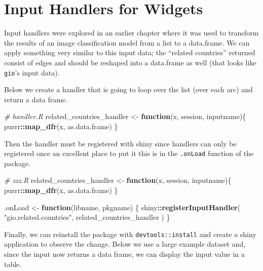 \documentclass[
  10pt,
]{krantz}
\makeatletter
\newenvironment{Shaded}{\begin{snugshade}}{\end{snugshade}}
\newcommand{\CommentTok}[1]{\textcolor[rgb]{0.37,0.37,0.37}{\textit{#1}}}
\newcommand{\ControlFlowTok}[1]{\textcolor[rgb]{0.27,0.27,0.27}{\textbf{#1}}}
\newcommand{\KeywordTok}[1]{\textcolor[rgb]{0.27,0.27,0.27}{\textbf{#1}}}
\newcommand{\NormalTok}[1]{#1}
\newcommand{\OperatorTok}[1]{\textcolor[rgb]{0.43,0.43,0.43}{\textbf{#1}}}
\newcommand{\StringTok}[1]{\textcolor[rgb]{0.5,0.5,0.5}{#1}}
\newenvironment{kframe}{%
\medskip{}
\setlength{\fboxsep}{.8em}
 \def\at@end@of@kframe{}%
 \ifinner\ifhmode%
  \def\at@end@of@kframe{\end{minipage}}%
  \begin{minipage}{\columnwidth}%
 \fi\fi%
 \def\FrameCommand##1{\hskip\@totalleftmargin \hskip-\fboxsep
 \colorbox{shadecolor}{##1}\hskip-\fboxsep
     \hskip-\linewidth \hskip-\@totalleftmargin \hskip\columnwidth}%
 \MakeFramed {\advance\hsize-\width
   \@totalleftmargin\z@ \linewidth\hsize
   \@setminipage}}%
 {\par\unskip\endMakeFramed%
 \at@end@of@kframe}
\renewenvironment{Shaded}{\begin{kframe}}{\end{kframe}}
\makeatother
\begin{document}
\hypertarget{shiny-widgets-handlers}{%
\section{Input Handlers for Widgets}\label{shiny-widgets-handlers}}

Input handlers were explored in an earlier chapter where it was used to transform the results of an image classification model from a list to a data.frame. We can apply something very similar to this input data; the ``related countries'' returned consist of edges and should be reshaped into a data.frame as well (that looks like \texttt{gio}'s input data).

Below we create a handler that is going to loop over the list (over each arc) and return a data frame.

\begin{Shaded}
\begin{Highlighting}[]
\CommentTok{\# handler.R}
\NormalTok{related\_countries\_handler <{-}}\StringTok{ }\ControlFlowTok{function}\NormalTok{(x, session, inputname)\{}
\NormalTok{  purrr}\OperatorTok{::}\KeywordTok{map\_dfr}\NormalTok{(x, as.data.frame)}
\NormalTok{\}}
\end{Highlighting}
\end{Shaded}

Then the handler must be registered with shiny since handlers can only be registered once an excellent place to put it this is in the \texttt{.onLoad} function of the package.

\begin{Shaded}
\begin{Highlighting}[]
\CommentTok{\# zzz.R}
\NormalTok{related\_countries\_handler <{-}}\StringTok{ }\ControlFlowTok{function}\NormalTok{(x, session, inputname)\{}
\NormalTok{  purrr}\OperatorTok{::}\KeywordTok{map\_dfr}\NormalTok{(x, as.data.frame)}
\NormalTok{\}}

\NormalTok{.onLoad <{-}}\StringTok{ }\ControlFlowTok{function}\NormalTok{(libname, pkgname) \{}
\NormalTok{  shiny}\OperatorTok{::}\KeywordTok{registerInputHandler}\NormalTok{(}
    \StringTok{"gio.related.countries"}\NormalTok{, }
\NormalTok{    related\_countries\_handler}
\NormalTok{  )}
\NormalTok{\}}
\end{Highlighting}
\end{Shaded}

Finally, we can reinstall the package with \texttt{devtools::install} and create a shiny application to observe the change. Below we use a large example dataset and, since the input now returns a data frame, we can display the input value in a table.
\end{document}
